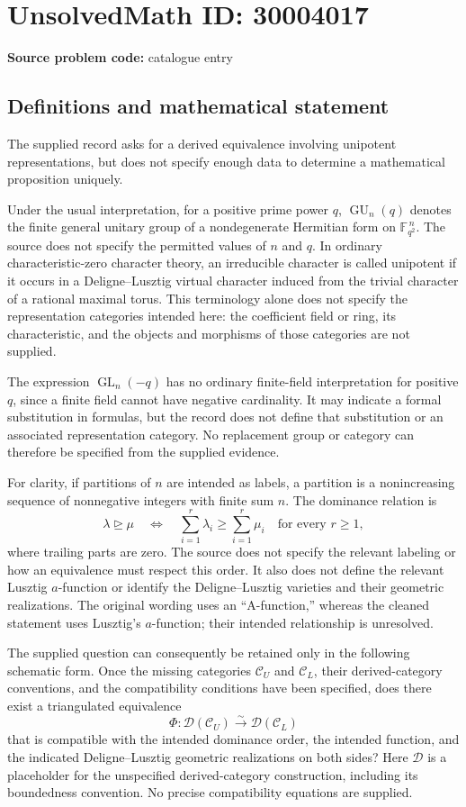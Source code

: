 \documentclass[11pt]{article}
\newcommand{\F}{\mathbb{F}}
\begin{document}
\section*{UnsolvedMath ID: 30004017}
\textbf{Source problem code:} catalogue entry
\subsection{Definitions and mathematical statement}
The supplied record asks for a derived equivalence involving unipotent representations, but does not specify enough data to determine a mathematical proposition uniquely.

Under the usual interpretation, for a positive prime power \(q\), \(\operatorname{GU}_n(q)\) denotes the finite general unitary group of a nondegenerate Hermitian form on \(\F_{q^2}^{\,n}\). The source does not specify the permitted values of \(n\) and \(q\). In ordinary characteristic-zero character theory, an irreducible character is called unipotent if it occurs in a Deligne--Lusztig virtual character induced from the trivial character of a rational maximal torus. This terminology alone does not specify the representation categories intended here: the coefficient field or ring, its characteristic, and the objects and morphisms of those categories are not supplied.

The expression \(\operatorname{GL}_n(-q)\) has no ordinary finite-field interpretation for positive \(q\), since a finite field cannot have negative cardinality. It may indicate a formal substitution in formulas, but the record does not define that substitution or an associated representation category. No replacement group or category can therefore be specified from the supplied evidence.

For clarity, if partitions of \(n\) are intended as labels, a partition is a nonincreasing sequence of nonnegative integers with finite sum \(n\). The dominance relation is
\[
\lambda\unrhd\mu
\quad\Longleftrightarrow\quad
\sum_{i=1}^{r}\lambda_i\geq\sum_{i=1}^{r}\mu_i
\quad\text{for every }r\geq1,
\]
where trailing parts are zero. The source does not specify the relevant labeling or how an equivalence must respect this order. It also does not define the relevant Lusztig \(a\)-function or identify the Deligne--Lusztig varieties and their geometric realizations. The original wording uses an ``A-function,'' whereas the cleaned statement uses Lusztig's \(a\)-function; their intended relationship is unresolved.

The supplied question can consequently be retained only in the following schematic form. Once the missing categories \(\mathcal C_U\) and \(\mathcal C_L\), their derived-category conventions, and the compatibility conditions have been specified, does there exist a triangulated equivalence
\[
\Phi:\mathcal D(\mathcal C_U)\xrightarrow{\sim}\mathcal D(\mathcal C_L)
\]
that is compatible with the intended dominance order, the intended function, and the indicated Deligne--Lusztig geometric realizations on both sides? Here \(\mathcal D\) is a placeholder for the unspecified derived-category construction, including its boundedness convention. No precise compatibility equations are supplied.
\end{document}

